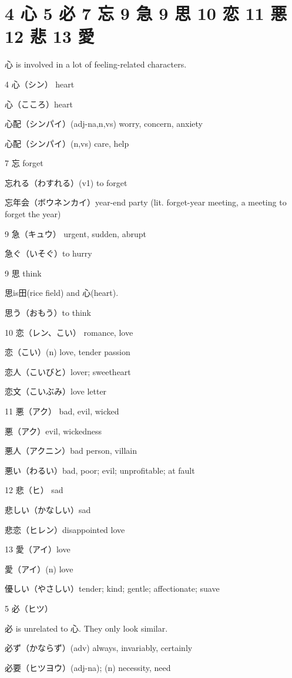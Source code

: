 \section{4 心 5 必 7 忘 9 急 9 思 10 恋 11 悪 12 悲 13 愛}

心 is involved in a lot of feeling-related characters.

4 心（シン） heart

心（こころ）heart

心配（シンパイ）(adj-na,n,vs) worry, concern, anxiety

心配（シンパイ）(n,vs) care, help

7 忘 forget

忘れる（わすれる）(v1) to forget

忘年会（ボウネンカイ）year-end party (lit. forget-year meeting, a meeting to forget the year)

9 急（キュウ） urgent, sudden, abrupt

急ぐ（いそぐ）to hurry

9 思 think

思is田(rice field) and 心(heart).

思う（おもう）to think

10 恋（レン、こい） romance, love

恋（こい）(n) love, tender passion

恋人（こいびと）lover; sweetheart

恋文（こいぶみ）love letter

11 悪（アク） bad, evil, wicked

悪（アク）evil, wickedness

悪人（アクニン）bad person, villain

悪い（わるい）bad, poor; evil; unprofitable; at fault

12 悲（ヒ） sad

悲しい（かなしい）sad

悲恋（ヒレン）disappointed love

13 愛（アイ）love

愛（アイ）(n) love

優しい（やさしい）tender; kind; gentle; affectionate; suave

5 必（ヒツ）

必 is unrelated to 心. They only look similar.

必ず（かならず）(adv) always, invariably, certainly

必要（ヒツヨウ）(adj-na); (n) necessity, need
